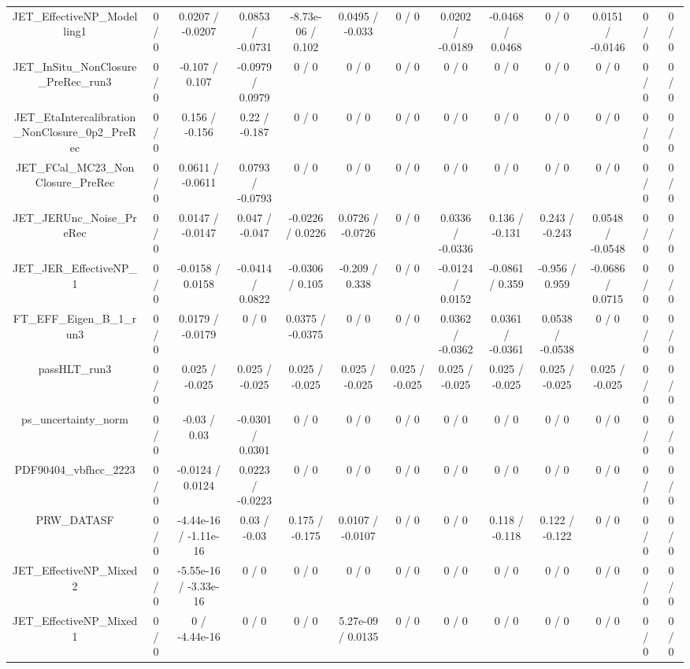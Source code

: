 \documentclass[10pt]{article}
\begin{document}
\begin{table}[htbp]
\begin{center}
\begin{tabular}{|c|c|c|c|c|c|c|c|c|c|c|c|c|}
  JET_EffectiveNP_Modelling1 & 0 / 0 & 0.0207 / -0.0207 & 0.0853 / -0.0731 & -8.73e-06 / 0.102 & 0.0495 / -0.033 & 0 / 0 & 0.0202 / -0.0189 & -0.0468 / 0.0468 & 0 / 0 & 0.0151 / -0.0146 & 0 / 0 & 0 / 0 \\ 
  JET_InSitu_NonClosure_PreRec_run3 & 0 / 0 & -0.107 / 0.107 & -0.0979 / 0.0979 & 0 / 0 & 0 / 0 & 0 / 0 & 0 / 0 & 0 / 0 & 0 / 0 & 0 / 0 & 0 / 0 & 0 / 0 \\ 
  JET_EtaIntercalibration_NonClosure_0p2_PreRec & 0 / 0 & 0.156 / -0.156 & 0.22 / -0.187 & 0 / 0 & 0 / 0 & 0 / 0 & 0 / 0 & 0 / 0 & 0 / 0 & 0 / 0 & 0 / 0 & 0 / 0 \\ 
  JET_FCal_MC23_NonClosure_PreRec & 0 / 0 & 0.0611 / -0.0611 & 0.0793 / -0.0793 & 0 / 0 & 0 / 0 & 0 / 0 & 0 / 0 & 0 / 0 & 0 / 0 & 0 / 0 & 0 / 0 & 0 / 0 \\ 
  JET_JERUnc_Noise_PreRec & 0 / 0 & 0.0147 / -0.0147 & 0.047 / -0.047 & -0.0226 / 0.0226 & 0.0726 / -0.0726 & 0 / 0 & 0.0336 / -0.0336 & 0.136 / -0.131 & 0.243 / -0.243 & 0.0548 / -0.0548 & 0 / 0 & 0 / 0 \\ 
  JET_JER_EffectiveNP_1 & 0 / 0 & -0.0158 / 0.0158 & -0.0414 / 0.0822 & -0.0306 / 0.105 & -0.209 / 0.338 & 0 / 0 & -0.0124 / 0.0152 & -0.0861 / 0.359 & -0.956 / 0.959 & -0.0686 / 0.0715 & 0 / 0 & 0 / 0 \\ 
  FT_EFF_Eigen_B_1_run3 & 0 / 0 & 0.0179 / -0.0179 & 0 / 0 & 0.0375 / -0.0375 & 0 / 0 & 0 / 0 & 0.0362 / -0.0362 & 0.0361 / -0.0361 & 0.0538 / -0.0538 & 0 / 0 & 0 / 0 & 0 / 0 \\ 
  passHLT_run3 & 0 / 0 & 0.025 / -0.025 & 0.025 / -0.025 & 0.025 / -0.025 & 0.025 / -0.025 & 0.025 / -0.025 & 0.025 / -0.025 & 0.025 / -0.025 & 0.025 / -0.025 & 0.025 / -0.025 & 0 / 0 & 0 / 0 \\ 
  ps_uncertainty_norm & 0 / 0 & -0.03 / 0.03 & -0.0301 / 0.0301 & 0 / 0 & 0 / 0 & 0 / 0 & 0 / 0 & 0 / 0 & 0 / 0 & 0 / 0 & 0 / 0 & 0 / 0 \\ 
  PDF90404_vbfhcc_2223 & 0 / 0 & -0.0124 / 0.0124 & 0.0223 / -0.0223 & 0 / 0 & 0 / 0 & 0 / 0 & 0 / 0 & 0 / 0 & 0 / 0 & 0 / 0 & 0 / 0 & 0 / 0 \\ 
  PRW_DATASF & 0 / 0 & -4.44e-16 / -1.11e-16 & 0.03 / -0.03 & 0.175 / -0.175 & 0.0107 / -0.0107 & 0 / 0 & 0 / 0 & 0.118 / -0.118 & 0.122 / -0.122 & 0 / 0 & 0 / 0 & 0 / 0 \\ 
  JET_EffectiveNP_Mixed2 & 0 / 0 & -5.55e-16 / -3.33e-16 & 0 / 0 & 0 / 0 & 0 / 0 & 0 / 0 & 0 / 0 & 0 / 0 & 0 / 0 & 0 / 0 & 0 / 0 & 0 / 0 \\ 
  JET_EffectiveNP_Mixed1 & 0 / 0 & 0 / -4.44e-16 & 0 / 0 & 0 / 0 & 5.27e-09 / 0.0135 & 0 / 0 & 0 / 0 & 0 / 0 & 0 / 0 & 0 / 0 & 0 / 0 & 0 / 0 \\ 

\end{tabular}
\end{center}
\end{table}
\end{document}
